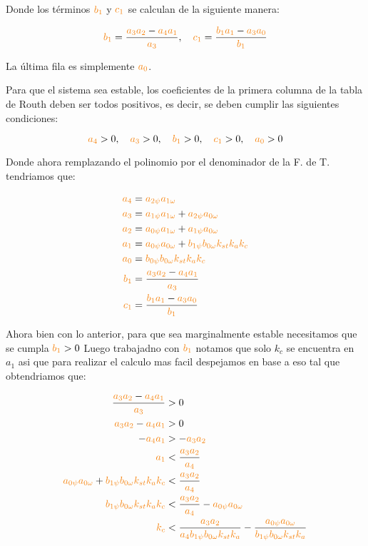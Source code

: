Donde los términos \(\nara{b_1}\) y \(\nara{c_1}\) se calculan de la siguiente manera:

\[
\nara{b_1} = \frac{\nara{a_3 a_2} - \nara{a_4 a_1}}{\nara{a_3}}, \quad \nara{c_1} = \frac{\nara{b_1 a_1} - \nara{a_3 a_0}}{\nara{b_1}}
\]

La última fila es simplemente \(\nara{a_0}\).

Para que el sistema sea estable, los coeficientes de la primera columna de la tabla de Routh deben ser todos positivos, es decir, se deben cumplir las siguientes condiciones:

\[
\nara{a_4} > 0, \quad \nara{a_3} > 0, \quad \nara{b_1} > 0, \quad \nara{c_1} > 0, \quad \nara{a_0} > 0
\]


Donde ahora remplazando el polinomio por el denominador de la F. de T. tendriamos que:


\begin{align*}
  \nara{a_4} &= \nara{a_{2\psi} a_{1\omega}} \\
  \nara{a_3} &= \nara{a_{1\psi} a_{1\omega}} + \nara{a_{2\psi} a_{0\omega}} \\
  \nara{a_2} &= \nara{a_{0\psi} a_{1\omega}} + \nara{a_{1\psi} a_{0\omega}} \\
  \nara{a_1} &= \nara{a_{0\psi} a_{0\omega}} + \nara{b_{1\psi} b_{0\omega} k_{st} k_a k_c} \\
  \nara{a_0} &= \nara{b_{0\psi} b_{0\omega} k_{st} k_a k_c} \\
  \nara{b_1} &= \frac{\nara{a_3 a_2} - \nara{a_4 a_1}}{\nara{a_3}} \\
  \nara{c_1} &= \frac{\nara{b_1 a_1} - \nara{a_3 a_0}}{\nara{b_1}}
  \end{align*}

Ahora bien con lo anterior, para que sea marginalmente estable necesitamos que se cumpla  \(\nara{b_1} > 0\)     
Luego trabajadno con $\nara{b_1}$ notamos que solo $k_c$ se encuentra en $a_1$
asi que para realizar el calculo mas facil despejamos en base a eso tal que obtendriamos que: 


\begin{align} 
  \frac{\nara{a_3 a_2} - \nara{a_4 a_1}}{\nara{a_3}} &> 0 \\
  \nara{a_3 a_2} - \nara{a_4 a_1} &> 0 \\
  - \nara{a_4 a_1} &> - \nara{a_3 a_2} \\
  \nara{a_1} &< \frac{\nara{a_3 a_2}}{\nara{a_4}} \\
  \nara{a_{0\psi} a_{0\omega}} + \nara{b_{1\psi} b_{0\omega} k_{st} k_a k_c} &< \frac{\nara{a_3 a_2}}{\nara{a_4}} \\
  \nara{b_{1\psi} b_{0\omega} k_{st} k_a k_c} &< \frac{\nara{a_3 a_2}}{\nara{a_4}} - \nara{a_{0\psi} a_{0\omega}} \\
  \nara{k_c}  &< \frac{\nara{a_3 a_2}}{\nara{a_4 b_{1\psi} b_{0\omega} k_{st} k_a}}  - \frac{\nara{a_{0\psi} a_{0\omega}}}{\nara{b_{1\psi} b_{0\omega} k_{st} k_a}}  \\
\end{align}

